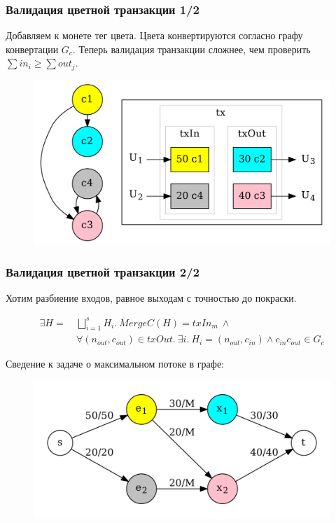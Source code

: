 \documentclass[11pt,handout,pdf,hyperref={unicode}]{beamer}
\begin{document}
\begin{frame}
  \frametitle{Валидация цветной транзакции 1/2}

  Добавляем к монете тег цвета. Цвета конвертируются согласно графу
  конвертации $G_c$. Теперь валидация транзакции сложнее, чем
  проверить $\sum{in_i} \geq \sum {out_j}$.

  \begin{figure}[t]
  \includegraphics[scale=0.17]{pres_colortx.png}
  \centering
  \end{figure}

\end{frame}

\begin{frame}
  \frametitle{Валидация цветной транзакции 2/2}

  Хотим разбиение входов, равное выходам с точностью до покраски.

  \begin{align*}
    \exists H = \ &\bigsqcup_{i=1}^s{H_i}. \ MergeC(H) = txIn_m \ \wedge \nonumber \\
                  &\forall (n_{out},c_{out}) \in txOut . \ \exists i . \ H_i = (n_{out},c_{in}) \wedge c_{in}c_{out} \in G_c \label{eq:1}
  \end{align*}

  Сведение к задаче о максимальном потоке в графе:

  \begin{figure}[t]
  \includegraphics[scale=0.12]{pres_colortx_graph}
  \centering
  \end{figure}
\end{frame}
\end{document}
